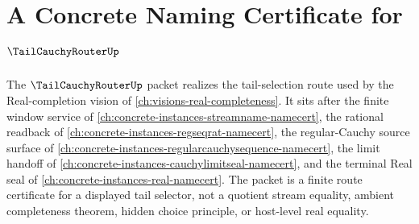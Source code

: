 \chapter{A Concrete Naming Certificate for $\TailCauchyRouterUp$}
\label{ch:concrete-instances-tailcauchyrouter-namecert}

The $\TailCauchyRouterUp$ packet realizes the tail-selection route used by the Real-completion vision of \autoref{ch:visions-real-completeness}. It sits after the finite window service of \autoref{ch:concrete-instances-streamname-namecert}, the rational readback of \autoref{ch:concrete-instances-regseqrat-namecert}, the regular-Cauchy source surface of \autoref{ch:concrete-instances-regularcauchysequence-namecert}, the limit handoff of \autoref{ch:concrete-instances-cauchylimitseal-namecert}, and the terminal Real seal of \autoref{ch:concrete-instances-real-namecert}. The packet is a finite route certificate for a displayed tail selector, not a quotient stream equality, ambient completeness theorem, hidden choice principle, or host-level real equality.

